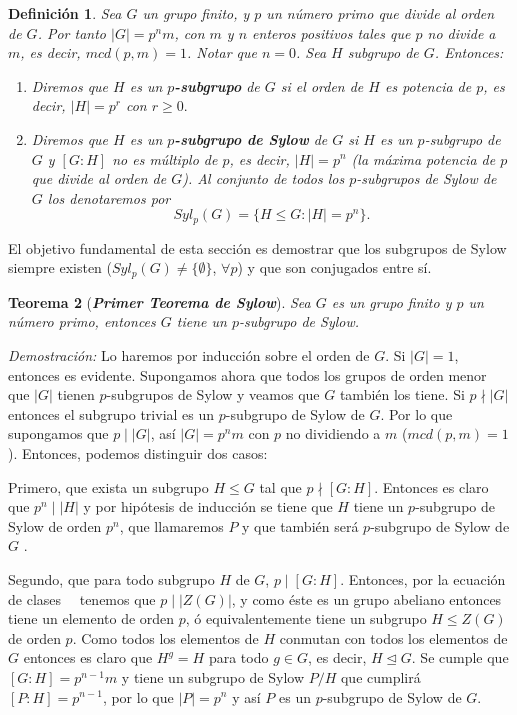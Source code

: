 \documentclass[12pt]{article}
\newtheorem{theorem}{Teorema}[section]
\newtheorem{definition}[theorem]{Definición}
\begin{document}
\begin{definition} Sea $G$ un grupo finito, y $p$ un número primo que divide al orden de $G$. Por tanto $|G| = p^{n}m$, con $m$ y $n$ enteros positivos tales que $p$ no divide a $m$, es decir, $mcd(p,m)=1$. Notar que $n=0$. Sea $H$ subgrupo de $G$. Entonces:
\begin{enumerate}
\item Diremos que $H$ es un \textbf{$p$-subgrupo} de $G$ si el orden de $H$ es potencia de $p$, es decir, $|H| = p^{r}$ con $r \geq 0.$
\item Diremos que $H$ es un \textbf{$p$-subgrupo de Sylow} de $G$ si $H$ es un $p$-subgrupo de $G$ y $\left[ G:H \right]$ no es múltiplo de $p$, es decir, $|H| = p^{n}$ (la máxima potencia de $p$ que divide al orden de $G$). Al conjunto de todos los $p$-subgrupos de Sylow de $G$ los denotaremos por $$Syl_{p}(G) = \lbrace H \leq G : |H| = p^{n} \rbrace.$$
\end{enumerate}
\end{definition}

El objetivo fundamental de esta sección es demostrar que los subgrupos de Sylow siempre existen ($Syl_{p}(G) \neq \lbrace \emptyset \rbrace$, $\forall p$) y que son conjugados entre sí. 

\begin{theorem}[\textit{\textbf{Primer Teorema de Sylow}}]
Sea $G$ es un grupo finito y $p$ un número primo, entonces $G$ tiene un $p$-subgrupo de Sylow.
\end{theorem}
\emph{Demostración: }Lo haremos por inducción sobre el orden de $G$. Si $|G| = 1$, entonces es evidente. Supongamos ahora que todos los grupos de orden menor que $|G|$ tienen $p$-subgrupos de Sylow y veamos que $G$ también los tiene.
Si $p \nmid |G|$ entonces el subgrupo trivial es un $p$-subgrupo de Sylow de $G$. Por lo que supongamos que $p \mid |G|$, así $|G| = p^{n}m$ con $p$ no dividiendo a $m$ ($mcd(p,m)=1$). Entonces, podemos distinguir dos casos: 

Primero, que exista un subgrupo $H \leq G$ tal que $p \nmid [G:H]$. Entonces es claro que $p^{n} \mid |H|$ y por hipótesis de inducción se tiene que $H$ tiene un $p$-subgrupo de Sylow de orden $p^{n}$, que llamaremos $P$ y que también será $p$-subgrupo de Sylow de $G$ .

Segundo, que para todo subgrupo $H$ de $G$, $p \mid [G:H]$. Entonces, por la ecuación de clases~~ tenemos que $p \mid |Z(G)|$, y como éste es un grupo abeliano entonces tiene un elemento de orden $p$, ó equivalentemente tiene un subgrupo $H \leq Z(G)$ de orden $p$. Como todos los elementos de $H$ conmutan con todos los elementos de $G$ entonces es claro que $H^{g} = H$ para todo $g \in G$, es decir, $H \unlhd G$. Se cumple que $[G:H] = p^{n-1}m$ y tiene un subgrupo de Sylow $P/H$ que cumplirá $[P:H] = p^{n-1}$, por lo que $|P| = p^{n}$ y así $P$ es un $p$-subgrupo de Sylow de $G$.
\end{document}
